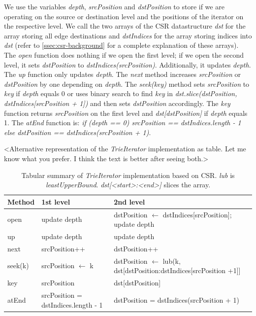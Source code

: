 We use the variables \textit{depth}, \textit{srcPosition} and \textit{dstPosition} to store if we are operating on the source or destination
level and the positions of the iterator on the respective level.
We call the two arrays of the \textsc{CSR} datastructure \textit{dst} for the array storing all edge destinations and \textit{dstIndices}
for the array storing indices into \textit{dst} (refer to \cref{ssec:csr-background} for a complete explanation of these arrays).
The \textit{open} function does nothing if we open the first level; if we open the second level, it sets \textit{dstPosition} to
\textit{dstIndices(srcPosition)}.
Additionally, it updates \textit{depth}.
The \textit{up} function only updates \textit{depth}.
The \textit{next} method increases \textit{srcPosition} or \textit{dstPosition} by one depending on \textit{depth}.
The \textit{seek(key)} method sets \textit{srcPosition} to \textit{key} if \textit{depth} equals 0 or uses binary search to find
\textit{key} in \textit{dst.slice(dstPosition, dstIndices[srcPosition + 1])} and then sets \textit{dstPosition} accordingly.
The \textit{key} function returns \textit{srcPosition} on the first level and \textit{dst[dstPosition]} if \textit{depth} equals 1.
The \textit{atEnd} function is: \textit{if (depth == 0) srcPosition == dstIndices.length - 1 else dstPosition == dstIndices(srcPosition +
1)}.

<Alternative representation of the \textit{TrieIterator} implementation as table. Let me know what you prefer. I think the text is better
after seeing both.>
\begin{table}[H]
\begin{tabular}{@{}lll@{}}
\toprule
Method    & 1st level                           & 2nd level                                                                                       \\ \midrule
open      & update depth                        & dstPosition $\leftarrow$ dstIndices{[}srcPosition{]}; update depth                              \\
up        & update depth                        & update depth                                                                                    \\
next      & srcPosition++                       & dstPosition++                                                                                   \\
seek(k) & srcPosition $\leftarrow$ k            & dstPosition $\leftarrow$ lub(k, dst[dstPosition:dstIndices[srcPosition +1]] \\
key       & srcPosition                         & dst{[}dstPosition{]}                                                                            \\
atEnd     & srcPosition = dstIndices.length - 1 & dstPosition = dstIndices(srcPosition + 1)\\
\bottomrule
\end{tabular}
\caption{Tabular summary of \textit{TrieIterator} implementation based on \textsc{CSR}. \textit{lub} is \textit{leastUpperBound}.
\textit{dst[<start>:<end>]} slices the array.}
\end{table}

